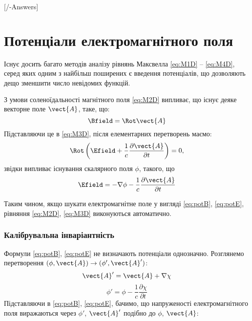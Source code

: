 
[\currfilebase/\currfilebase-Answers]
\chapter{Потенціали електромагнітного поля}\label{\currfilebase}


Існує досить багато методів аналізу рівнянь Максвелла \eqref{eq:M1D} -- \eqref{eq:M4D}, серед яких одним з найбільш поширених є введення потенціалів, що
дозволяють дещо
зменшити число невідомих функцій.

З умови соленоїдальності магнітного поля \eqref{eq:M2D} випливає, що існує деяке векторне поле $\vect{A}$, таке, що:
\begin{equation}\label{eq:potB}
	 \Bfield = \Rot\vect{A}
\end{equation}
Підставляючи це в \eqref{eq:M3D}, після елементарних перетворень маємо:
\begin{equation*}
	\Rot \left( \Efield + \frac{1}{c} \frac{\partial \vect{A}}{\partial t}\right)  = 0,
\end{equation*}
звідки випливає існування скалярного поля $\phi$, такого, що
\begin{equation}\label{eq:potE}
	\Efield = -\nabla \phi - \frac{1}{c} \frac{\partial \vect{A}}{\partial t}
\end{equation}

Таким чином, якщо шукати електромагнітне поле у вигляді \eqref{eq:potB}, \eqref{eq:potE}, рівняння \eqref{eq:M2D}, \eqref{eq:M3D} виконуються
автоматично.

\subsection*{Калібрувальна інваріантність}

Формули \eqref{eq:potB}, \eqref{eq:potE} не визначають потенціали однозначно. Розглянемо перетворення $(\phi, \vect{A}) \to (\phi', \vect{A}')$:
\begin{equation}\label{eq:A'}
	\vect{A}' = \vect{A} + \nabla \chi
\end{equation}
\begin{equation}\label{eq:phi'}
	\phi' = \phi - \frac{1}{c} \frac{\partial \chi}{\partial t}
\end{equation}
Підставляючи в \eqref{eq:potB}, \eqref{eq:potE}, бачимо, що напруженості електромагнітного
поля виражаються через $\phi'$, $\vect{A}'$ подібно до $\phi$, $\vect{A}$:

